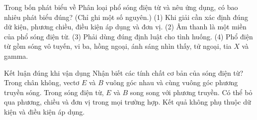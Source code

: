 \begin{ex}
Trong bốn phát biểu về Phân loại phổ sóng điện từ và nêu ứng dụng, có bao nhiêu phát biểu đúng? (Chỉ ghi một số nguyên.) (1) Khi giải cần xác định đúng dữ kiện, phương chiều, điều kiện áp dụng và đơn vị. (2) Âm thanh là một miền của phổ sóng điện từ. (3) Phải dùng đúng định luật cho tình huống. (4) Phổ điện từ gồm sóng vô tuyến, vi ba, hồng ngoại, ánh sáng nhìn thấy, tử ngoại, tia $X$ và gamma.
\end{ex}

\begin{ex}
Kết luận đúng khi vận dụng Nhận biết các tính chất cơ bản của sóng điện từ?
\choice
{\True Trong chân không, vectơ $E$ và $B$ vuông góc nhau và cùng vuông góc phương truyền sóng.}
{Trong sóng điện từ, $E$ và $B$ song song với phương truyền.}
{Có thể bỏ qua phương, chiều và đơn vị trong mọi trường hợp.}
{Kết quả không phụ thuộc dữ kiện và điều kiện áp dụng.}
\end{ex}

